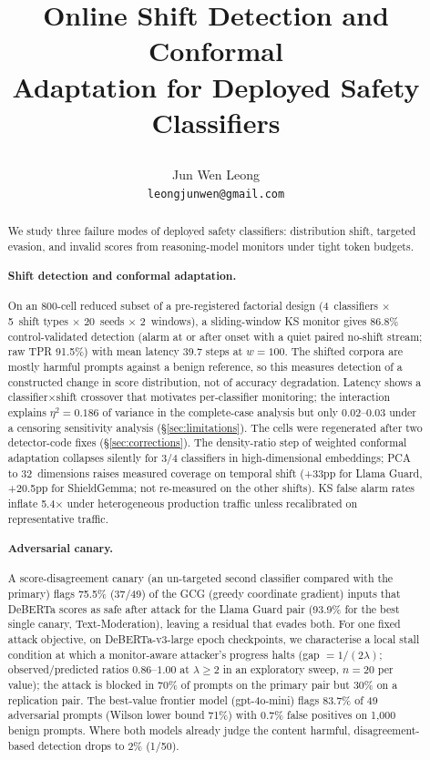 \documentclass{article}
\title{\raggedright\hyphenpenalty=10000\exhyphenpenalty=10000 Online Shift Detection and Conformal\\Adaptation for Deployed Safety Classifiers}
\author{Jun Wen Leong \\
\texttt{leongjunwen@gmail.com}}
\begin{document}
\maketitle
{}

\begin{abstract}
We study three failure modes of deployed safety classifiers: distribution shift, targeted evasion, and invalid scores from reasoning-model monitors under tight token budgets.

\paragraph{Shift detection and conformal adaptation.} On an 800-cell reduced subset of a pre-registered factorial design (4~classifiers $\times$ 5~shift types $\times$ 20~seeds $\times$ 2~windows), a sliding-window KS monitor gives 86.8\% control-validated detection (alarm at or after onset with a quiet paired no-shift stream; raw TPR 91.5\%) with mean latency 39.7 steps at $w{=}100$. The shifted corpora are mostly harmful prompts against a benign reference, so this measures detection of a constructed change in score distribution, not of accuracy degradation. Latency shows a classifier$\times$shift crossover that motivates per-classifier monitoring; the interaction explains $\eta^2 = 0.186$ of variance in the complete-case analysis but only $0.02$--$0.03$ under a censoring sensitivity analysis (\S\ref{sec:limitations}). The cells were regenerated after two detector-code fixes (\S\ref{sec:corrections}). The density-ratio step of weighted conformal adaptation collapses silently for 3/4 classifiers in high-dimensional embeddings; PCA to 32~dimensions raises measured coverage on temporal shift (+33pp for Llama Guard, +20.5pp for ShieldGemma; not re-measured on the other shifts). KS false alarm rates inflate 5.4$\times$ under heterogeneous production traffic unless recalibrated on representative traffic.

\paragraph{Adversarial canary.} A score-disagreement canary (an un-targeted second classifier compared with the primary) flags 75.5\% (37/49) of the GCG (greedy coordinate gradient) inputs that DeBERTa scores as safe after attack for the Llama Guard pair (93.9\% for the best single canary, Text-Moderation), leaving a residual that evades both. For one fixed attack objective, on DeBERTa-v3-large epoch checkpoints, we characterise a local stall condition at which a monitor-aware attacker's progress halts (gap $= 1/(2\lambda)$; observed/predicted ratios $0.86$--$1.00$ at $\lambda \geq 2$ in an exploratory sweep, $n{=}20$ per value); the attack is blocked in 70\% of prompts on the primary pair but 30\% on a replication pair. The best-value frontier model (gpt-4o-mini) flags 83.7\% of 49 adversarial prompts (Wilson lower bound 71\%) with 0.7\% false positives on 1{,}000 benign prompts. Where both models already judge the content harmful, disagreement-based detection drops to 2\% (1/50).


\end{abstract}
\end{document}
